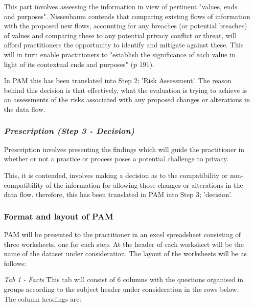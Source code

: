 This part involves assessing the information in view of pertinent "values, ends and purposes". Nissenbaum contends that comparing existing flows of information with the proposed new flows, accounting for any breaches (or potential breaches) of values and comparing these to any potential privacy conflict or threat, will afford practitioners the opportunity to identify and mitigate against these. This will in turn enable practitioners to "establish the significance of each value in light of its contextual ends and purposes" (p 191).

In PAM this has been translated into Step 2; 'Risk Assessment'. The reason behind this decision is that effectively, what the evaluation is trying to achieve is an assessments of the risks associated with any proposed changes or alterations in the data flow. 

\subsubsection {{\it Prescription (Step 3 - Decision)}}

Prescription involves presenting the findings which will guide the practitioner in whether or not a practice or process poses a potential challenge to privacy.

This, it is contended, involves making a decision as to the compatibility or non-compatibility of the information for allowing those changes or alterations in the data flow. therefore, this has been translated in PAM into Step 3; 'decision'. 

\subsubsection{Format and layout of PAM}

PAM will be presented to the practitioner in an excel spreadsheet consisting of three worksheets, one for each step. At the header of each worksheet will be the name of the dataset under consideration. The layout of the worksheets will be as follows:

{\it Tab 1 - Facts}
This tab will consist of 6 columns with the questions organised in groups according to the subject header under consideration in the rows below. The column headings are:

